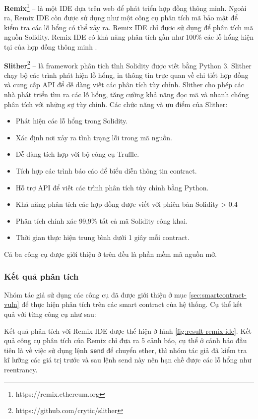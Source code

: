 \documentclass[../main-report.tex]{subfiles}
\begin{document}
\textbf{Remix}\footnote{https://remix.ethereum.org} -- là một IDE dựa trên web để phát triển hợp đồng thông minh. Ngoài ra, Remix IDE còn được sử dụng như một công cụ phân tích mã bảo mật để kiểm tra các lỗ hổng có thể xảy ra. Remix IDE chỉ được sử dụng để phân tích mã nguồn Solidity. Remix IDE có khả năng phân tích gần như 100\% các lỗ hổng hiện tại của hợp đồng thông minh \cite{dika2017ethereum}.

\textbf{Slither}\footnote{https://github.com/crytic/slither} -- là framework phân tích tĩnh Solidity được viết bằng Python 3. Slither chạy bộ các trình phát hiện lỗ hổng, in thông tin trực quan về chi tiết hợp đồng và cung cấp API để dễ dàng viết các phân tích tùy chỉnh. Slither cho phép các nhà phát triển tìm ra các lỗ hổng, tăng cường khả năng đọc mã và nhanh chóng phân tích với những sự tùy chỉnh. Các chức năng và ưu điểm của Slither:

\begin{itemize}
\item Phát hiện các lỗ hổng trong Solidity.
\item Xác định nơi xảy ra tình trạng lỗi trong mã nguồn.
\item Dễ dàng tích hợp với bộ công cụ Truffle.
\item Tích hợp các trình báo cáo để biểu diễn thông tin contract.
\item Hỗ trợ API để viết các trình phân tích tùy chỉnh bằng Python.
\item Khả năng phân tích các hợp đồng được viết với phiên bản Solidity > 0.4
\item Phân tích chính xác 99,9\% tất cả mã Solidity công khai.
\item Thời gian thực hiện trung bình dưới 1 giây mỗi contract.
\end{itemize}

Cả ba công cụ được giới thiệu ở trên đều là phần mềm mã nguồn mở.
\subsubsection{Kết quả phân tích}
Nhóm tác giả sử dụng các công cụ đã được giới thiệu ở mục \ref{sec:smartcontract-vuln} để thực hiện phân tích trên các smart contract của hệ thống. Cụ thể kết quả với từng công cụ như sau:

Kết quả phân tích với Remix IDE được thể hiện ở hình \ref{fig:result-remix-ide}. Kết quả công cụ phân tích của Remix chỉ đưa ra 5 cảnh báo, cụ thể ở cảnh báo đầu tiên là về việc sử dụng lệnh \texttt{send} để chuyển ether, thì nhóm tác giả đã kiểm tra kĩ lưỡng các giá trị trước và sau lệnh send này nên hạn chế được các lỗ hổng như reentrancy.
\end{document}

